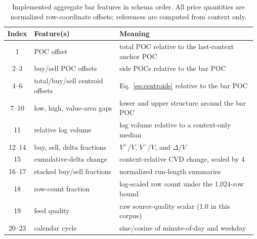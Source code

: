 \documentclass[10pt]{article}
\begin{document}
\begin{table}[H]
\centering
\small
\caption{Implemented aggregate bar features in schema order. All price quantities are normalized
row-coordinate offsets; references are computed from context only.}
\label{tab:bar-features}
\begin{tabularx}{\textwidth}{@{}c l X@{}}
\toprule
Index & Feature(s) & Meaning \\
\midrule
1 & POC offset & total POC relative to the last-context anchor POC \\
2--3 & buy/sell POC offsets & side POCs relative to the bar POC \\
4--6 & total/buy/sell centroid offsets & Eq.~\eqref{eq:centroids} relative to the bar POC \\
7--10 & low, high, value-area gaps & lower and upper structure around the bar POC \\
11 & relative log volume & log volume relative to a context-only median \\
12--14 & buy, sell, delta fractions & $V^+/V$, $V^-/V$, and $\Delta/V$ \\
15 & cumulative-delta change & context-relative CVD change, scaled by 4 \\
16--17 & stacked buy/sell fractions & normalized run-length summaries \\
18 & row-count fraction & log-scaled row count under the 1,024-row bound \\
19 & feed quality & raw source-quality scalar (1.0 in this corpus) \\
20--23 & calendar cycle & sine/cosine of minute-of-day and weekday \\
\bottomrule
\end{tabularx}
\end{table}
\end{document}

